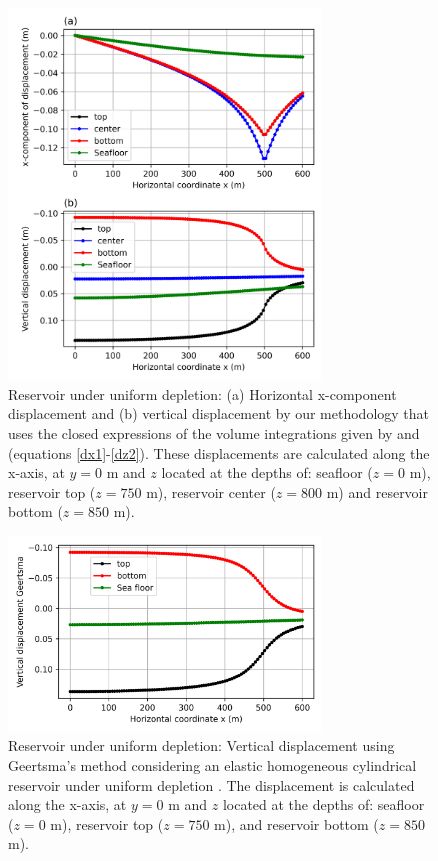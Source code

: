 \documentclass[journal abbreviation, manuscript]{copernicus}
\begin{document}
\begin{figure}[ht]
\includegraphics[width=8.3cm]{Fig/Figure_Displacement_z_levels.png}
\caption{Reservoir under uniform depletion: (a) Horizontal x-component displacement and (b) vertical displacement by our methodology that uses the closed expressions of the volume integrations given by \cite{Nagyetal2000} and \cite{Nagyetal2002} (equations \ref{dx1}-\ref{dz2}).
These displacements are calculated along the x-axis, at $y = 0$ m and $z$ located at the depths of:  seafloor ($z = 0$ m), reservoir top ($z = 750$ m), reservoir center ($z = 800$ m) and reservoir bottom ($z = 850$ m).}
\label{fig:displacement_z_levels}
\end{figure}

\begin{figure}[ht]
\includegraphics[width=8.3cm]{Fig/Figure_Displacement_z_levels_Geertsma.png}
\caption{Reservoir under uniform depletion: Vertical displacement using Geertsma’s method \citep{Geertsma73}  considering an elastic homogeneous cylindrical reservoir under uniform depletion \citep{Fjaer08}.
The displacement is calculated along the x-axis, at $y = 0$ m and $z$ located at the depths of:  seafloor ($z = 0$ m), reservoir top ($z = 750$ m), and reservoir bottom 
($z = 850$ m).}
\label{fig:displacement_z_levels_Geertsma}
\end{figure}
\end{document}
